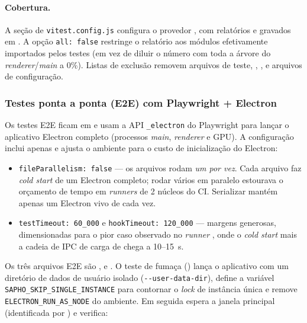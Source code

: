 \paragraph{Cobertura.} A seção  de \texttt{vitest.config.js}
configura o provedor , com relatórios  e 
gravados em . A opção \lstinline|all: false| restringe o
relatório aos módulos efetivamente importados pelos testes (em vez de diluir o
número com toda a árvore do \emph{renderer}/\emph{main} a 0\%). Listas de
exclusão removem arquivos de teste, , ,
 e arquivos de configuração.

\subsubsection{Testes ponta a ponta (E2E) com Playwright + Electron}

Os testes E2E ficam em  e usam a API \lstinline|_electron| do
Playwright para lançar o aplicativo Electron completo (processos \emph{main},
\emph{renderer} e GPU). A configuração  inclui apenas
 e ajusta o ambiente para o custo de inicialização
do Electron:

\begin{itemize}[nosep]
  \item \lstinline|fileParallelism: false| --- os arquivos rodam \emph{um por
        vez}. Cada arquivo faz \emph{cold start} de um Electron completo; rodar
        vários em paralelo estourava o orçamento de tempo em \emph{runners} de
        2 núcleos do CI. Serializar mantém apenas um Electron vivo de cada vez.
  \item \lstinline|testTimeout: 60_000| e \lstinline|hookTimeout: 120_000| ---
        margens generosas, dimensionadas para o pior caso observado no
        \emph{runner} , onde o \emph{cold start} mais a
        cadeia de IPC de carga de  chega a 10--15~s.
\end{itemize}

Os três arquivos E2E são ,  e
. O teste de fumaça () lança o
aplicativo com um diretório de dados de usuário isolado
(\lstinline|--user-data-dir|), define a variável
\lstinline|SAPHO_SKIP_SINGLE_INSTANCE| para contornar o \emph{lock} de instância
única e remove \lstinline|ELECTRON_RUN_AS_NODE| do ambiente. Em seguida espera a
janela principal (identificada por ) e verifica:

